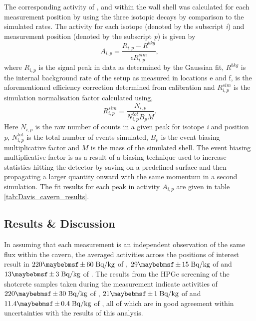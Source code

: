 The corresponding activity of \UTTE{}, \ThTTT{} and \KFZ{} within the wall shell was calculated for each measurement position by using the three isotopic decays by comparison to the simulated rates. The activity for each isotope (denoted by the subscript \textit{i}) and measurement position (denoted by the subscript \textit{p}) is given by
%
\begin{equation}
    A_{i,p} = \frac{R_{i,p} - R^{bkg}}{\epsilon{}R^{sim}_{i,p}},
    \label{eq:resolution_model}
\end{equation}
%
where $R_{i,p}$ is the signal peak in data as determined by the Gaussian fit, $R^{bkg}$ is the internal background rate of the setup as measured in locations e and f, \epsilon{} is the aforementioned efficiency correction determined from calibration and $R^{sim}_{i,p}$ is the simulation normalisation factor calculated using,
%
\begin{equation}
    R^{sim}_{i,p} = \frac{N_{i,p}}{N^{tot}_{i,p}B_{p}M}.
    \label{eq:resolution_model}
\end{equation}
%
Here $N_{i,p}$ is the raw number of counts in a given peak for isotope \textit{i} and position \textit{p}, $N^{tot}_{i,p}$ is the total number of events simulated, $B_{p}$ is the event biasing multiplicative factor and $M$ is the mass of the simulated shell. The event biasing multiplicative factor is as a result of a biasing technique used to increase \gray{} statistics hitting the detector by saving \grays{} on a predefined surface and then propagating a larger quantity onward with the same momentum in a second simulation. The fit results for each peak in activity $A_{i,p}$ are given in table \ref{tab:Davis_cavern_results}.


\subsection{Results \& Discussion}
\label{secsec:results_discussion}

In assuming that each measurement is an independent observation of the same flux within the cavern, the averaged activities across the positions of interest result in $220 \pm 60 \; \MathText{Bq/kg}$ of \KFZ{}, $29 \pm 15 \; \MathText{Bq/kg}$ of \UTTE{} and $13 \pm 3 \; \MathText{Bq/kg}$ of \ThTTT{}. The results from the HPGe screening of the shotcrete samples taken during the measurement indicate activities of $220 \pm 30 \; \MathText{Bq/kg}$ of \KFZ{}, $21 \pm 1 \; \MathText{Bq/kg}$ of \UTTE{} and $11.4 \pm 0.4 \; \MathText{Bq/kg}$ of \ThTTT{}, all of which are in good agreement within uncertainties with the results of this analysis. 


